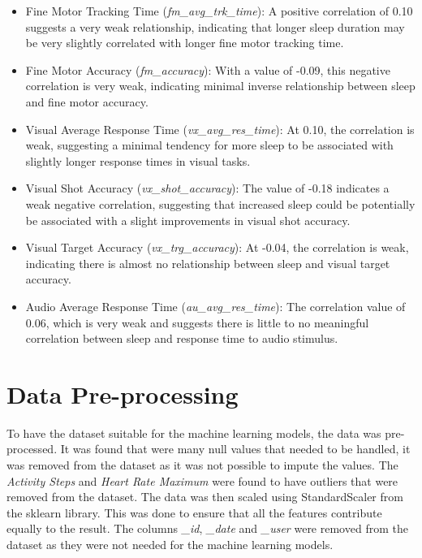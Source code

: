 \begin{itemize}
    \item Fine Motor Tracking Time (\textit{fm\_avg\_trk\_time}): A positive correlation of 0.10 suggests a very weak relationship, indicating that longer sleep duration
    may be very slightly correlated with longer fine motor tracking time. 
        
    \item Fine Motor Accuracy (\textit{fm\_accuracy}): With a value of -0.09, this negative correlation is very weak, indicating minimal inverse relationship between sleep
    and fine motor accuracy.
    
    \item Visual Average Response Time (\textit{vx\_avg\_res\_time}): At 0.10, the correlation is weak, suggesting a minimal tendency for more sleep to be associated with slightly
    longer response times in visual tasks.
    
    \item Visual Shot Accuracy (\textit{vx\_shot\_accuracy}): The value of -0.18 indicates a weak negative correlation, suggesting that increased sleep could be potentially be associated
    with a slight improvements in visual shot accuracy. 

    \item Visual Target Accuracy (\textit{vx\_trg\_accuracy}): At -0.04, the correlation is weak, indicating there is almost no relationship between sleep and visual target accuracy.
    
    \item Audio Average Response Time (\textit{au\_avg\_res\_time}): The correlation value of 0.06, which is very weak and suggests there is little to no meaningful correlation between
    sleep and response time to audio stimulus.
    
\end{itemize}


\section{Data Pre-processing}
To have the dataset suitable for the machine learning models, the data was pre-processed. It was found that were many null values that needed to be handled, 
it was removed from the dataset as it was not possible to impute the values. The \textit{Activity Steps} and \textit{Heart Rate Maximum} were found to have
outliers that were removed from the dataset. The data was then scaled using StandardScaler from the sklearn library. This was done to ensure that all the features
contribute equally to the result.
The columns \textit{\_id}, \textit{\_date} and \textit{\_user} were removed from the dataset as they were not needed for the machine learning models.


